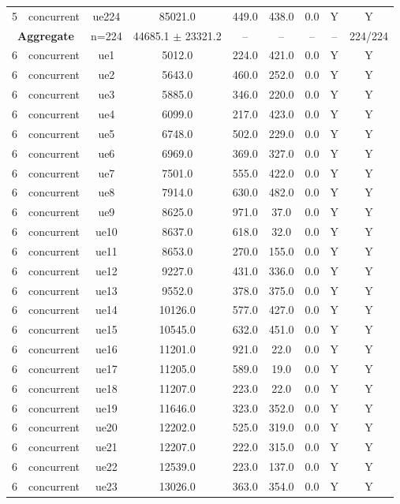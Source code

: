\begin{table}[ht]
\begin{tabular}{|c|c|c|c|c|c|c|c|c|}
5 & concurrent & ue224 & 85021.0 & 449.0 & 438.0 & 0.0 & Y & Y \\
\multicolumn{2}{|c|}{\textbf{Aggregate}} & n=224 & 44685.1 $\pm$ 23321.2 & -- & -- & -- & -- & 224/224 \\
\hline
6 & concurrent & ue1 & 5012.0 & 224.0 & 421.0 & 0.0 & Y & Y \\
6 & concurrent & ue2 & 5643.0 & 460.0 & 252.0 & 0.0 & Y & Y \\
6 & concurrent & ue3 & 5885.0 & 346.0 & 220.0 & 0.0 & Y & Y \\
6 & concurrent & ue4 & 6099.0 & 217.0 & 423.0 & 0.0 & Y & Y \\
6 & concurrent & ue5 & 6748.0 & 502.0 & 229.0 & 0.0 & Y & Y \\
6 & concurrent & ue6 & 6969.0 & 369.0 & 327.0 & 0.0 & Y & Y \\
6 & concurrent & ue7 & 7501.0 & 555.0 & 422.0 & 0.0 & Y & Y \\
6 & concurrent & ue8 & 7914.0 & 630.0 & 482.0 & 0.0 & Y & Y \\
6 & concurrent & ue9 & 8625.0 & 971.0 & 37.0 & 0.0 & Y & Y \\
6 & concurrent & ue10 & 8637.0 & 618.0 & 32.0 & 0.0 & Y & Y \\
6 & concurrent & ue11 & 8653.0 & 270.0 & 155.0 & 0.0 & Y & Y \\
6 & concurrent & ue12 & 9227.0 & 431.0 & 336.0 & 0.0 & Y & Y \\
6 & concurrent & ue13 & 9552.0 & 378.0 & 375.0 & 0.0 & Y & Y \\
6 & concurrent & ue14 & 10126.0 & 577.0 & 427.0 & 0.0 & Y & Y \\
6 & concurrent & ue15 & 10545.0 & 632.0 & 451.0 & 0.0 & Y & Y \\
6 & concurrent & ue16 & 11201.0 & 921.0 & 22.0 & 0.0 & Y & Y \\
6 & concurrent & ue17 & 11205.0 & 589.0 & 19.0 & 0.0 & Y & Y \\
6 & concurrent & ue18 & 11207.0 & 223.0 & 22.0 & 0.0 & Y & Y \\
6 & concurrent & ue19 & 11646.0 & 323.0 & 352.0 & 0.0 & Y & Y \\
6 & concurrent & ue20 & 12202.0 & 525.0 & 319.0 & 0.0 & Y & Y \\
6 & concurrent & ue21 & 12207.0 & 222.0 & 315.0 & 0.0 & Y & Y \\
6 & concurrent & ue22 & 12539.0 & 223.0 & 137.0 & 0.0 & Y & Y \\
6 & concurrent & ue23 & 13026.0 & 363.0 & 354.0 & 0.0 & Y & Y \\

\end{tabular}
\end{table}
